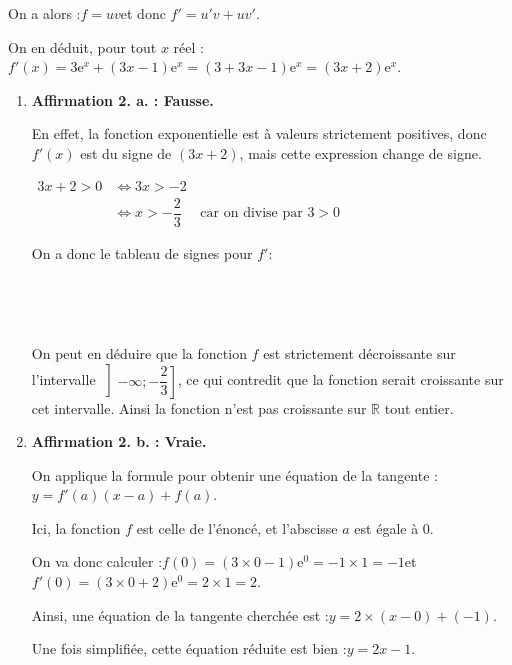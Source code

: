 \documentclass[10pt]{article}
\providecommand{\R}{\mathbb{R}}
\providecommand{\e}{{\mathrm{e}}}
\begin{document}
\begin{enumerate}
On a alors :\quad $f = uv$\quad et donc \quad $f' = u'v + uv'$.

On en déduit, pour tout $x$ réel :\quad $f'(x) = 3\e^{x} + (3x - 1)\e^{x} = (3 + 3x - 1)\e^{x} = (3x + 2)\e^{x}$.

\begin{enumerate}
\item \textbf{Affirmation 2. a. : Fausse.}

En effet, la fonction exponentielle est à valeurs strictement positives, donc $f'(x)$ est du signe de $(3x + 2)$, mais cette expression change de signe.

$\begin{aligned}
3x + 2 > 0 &\iff 3x > -2\\
			&\iff x > -\dfrac{2}{3} \quad \text{ car on divise par }3>0
\end{aligned}$

On a donc le tableau de signes pour $f'$:

\hfill~\hfill~

On peut en déduire que la fonction $f$ est strictement décroissante sur l'intervalle $\left]-\infty ; -\dfrac{2}{3}\right] $, ce qui contredit que la fonction serait croissante sur cet intervalle. Ainsi la fonction n'est pas croissante sur $\R$ tout entier.

\item \textbf{Affirmation 2. b. : Vraie.}

On applique la formule pour obtenir une équation de la tangente :\quad $y = f'(a) (x - a) + f(a)$.

Ici, la fonction $f$ est celle de l'énoncé, et l'abscisse $a$ est égale à 0.

On va donc calculer :\quad $f(0) = (3\times 0 - 1)\e^{0} = -1 \times 1 = -1$\quad et \quad $f'(0) = (3\times 0 + 2)\e^{0} = 2\times 1 = 2$.

Ainsi, une équation de la tangente cherchée est :\quad $y = 2 \times (x - 0) + (-1)$.

Une fois simplifiée, cette équation réduite est bien :\quad $y = 2x - 1$.
	\end{enumerate}
\end{enumerate}
\end{document}
